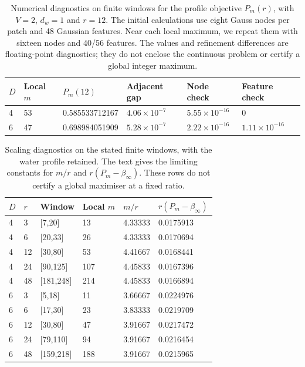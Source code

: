 \begin{table}[htbp]
\centering\small
\caption{Numerical diagnostics on finite windows for the profile objective $P_m(r)$, with $V=2$, $d_w=1$ and $r=12$. The initial calculations use eight Gauss nodes per patch and 48 Gaussian features. Near each local maximum, we repeat them with sixteen nodes and 40/56 features. The values and refinement differences are floating-point diagnostics; they do not enclose the continuous problem or certify a global integer maximum.}
\label{tab:profile_optimum_diagnostics}
\begin{tabular}{llllll}
\toprule
$D$ & Local $m$ & $P_m(12)$ & Adjacent gap & Node check & Feature check\\
\midrule
4 & 53 & 0.585533712167 & $4.06\times10^{-7}$ & $5.55\times10^{-16}$ & $0$\\
6 & 47 & 0.698984051909 & $5.28\times10^{-7}$ & $2.22\times10^{-16}$ & $1.11\times10^{-16}$\\
\bottomrule
\end{tabular}
\end{table}

\begin{table}[htbp]
\centering\small
\caption{Scaling diagnostics on the stated finite windows, with the water profile retained. The text gives the limiting constants for $m/r$ and $r(P_m-\beta_\infty)$. These rows do not certify a global maximiser at a fixed ratio.}
\label{tab:profile_optimum_scaling}
\begin{tabular}{llllll}
\toprule
$D$ & $r$ & Window & Local $m$ & $m/r$ & $r(P_m-\beta_\infty)$\\
\midrule
4 & 3 & [7,20] & 13 & 4.33333 & 0.0175913\\
4 & 6 & [20,33] & 26 & 4.33333 & 0.0170694\\
4 & 12 & [30,80] & 53 & 4.41667 & 0.0168441\\
4 & 24 & [90,125] & 107 & 4.45833 & 0.0167396\\
4 & 48 & [181,248] & 214 & 4.45833 & 0.0166894\\
6 & 3 & [5,18] & 11 & 3.66667 & 0.0224976\\
6 & 6 & [17,30] & 23 & 3.83333 & 0.0219709\\
6 & 12 & [30,80] & 47 & 3.91667 & 0.0217472\\
6 & 24 & [79,110] & 94 & 3.91667 & 0.0216454\\
6 & 48 & [159,218] & 188 & 3.91667 & 0.0215965\\
\bottomrule
\end{tabular}
\end{table}
